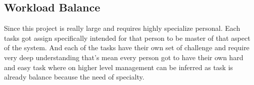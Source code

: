 \begin{multicols}{2}
\subsection{Workload Balance}
\label{subsec:workload-balance}
    Since this project is really large and requires highly specialize personal.
    Each tasks got assign specifically intended for that person to be master of that aspect of the system.
    And each of the tasks have their own set of challenge and require very deep understanding that's mean
    every person got to have their own hard and easy task where on higher level management can be inferred
    as task is already balance because the need of specialty.
\end{multicols}